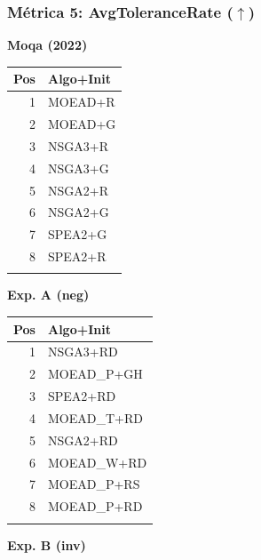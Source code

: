\documentclass[a4paper,10pt]{article}
\begin{document}
\subsubsection{Métrica 5: AvgToleranceRate \texorpdfstring{($\uparrow$)}{(up)}}
\begin{table}[H]
    \centering
    \begin{minipage}[t]{0.32\textwidth}
        \centering\scriptsize\textbf{Moqa (2022)}\\
        \begin{tabular}{rl}
            \toprule
            Pos & Algo+Init \\ \midrule
            1 & MOEAD+R \\
            2 & MOEAD+G \\
            3 & NSGA3+R \\
            4 & NSGA3+G \\
            5 & NSGA2+R \\
            6 & NSGA2+G \\
            7 & SPEA2+G \\
            8 & SPEA2+R \\
            \\
            \bottomrule
        \end{tabular}
    \end{minipage}
    \hfill
    \begin{minipage}[t]{0.32\textwidth}
        \centering\scriptsize\textbf{Exp. A (neg)}\\
        \begin{tabular}{rl}
            \toprule
            Pos & Algo+Init \\ \midrule
            1 & NSGA3+RD \\
            2 & MOEAD\_P+GH \\
            3 & SPEA2+RD \\
            4 & MOEAD\_T+RD \\
            5 & NSGA2+RD \\
            6 & MOEAD\_W+RD \\
            7 & MOEAD\_P+RS \\
            8 & MOEAD\_P+RD \\
            \\
            \bottomrule
        \end{tabular}
    \end{minipage}
    \hfill
    \begin{minipage}[t]{0.32\textwidth}
        \centering\scriptsize\textbf{Exp. B (inv)}\\

\end{minipage}
\end{table}
\end{document}
